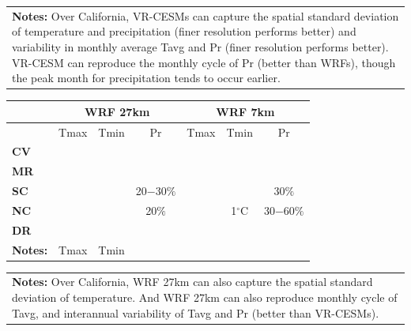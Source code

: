 \documentclass[draft,ms]{agutex}   %
\begin{document}
\begin{table}
\begin{center}
\begin{tabular}{p{6in}}
\small\textbf{Notes:} Over California, VR-CESMs can capture the spatial standard deviation of temperature and precipitation (finer resolution performs better) and variability in monthly average Tavg and Pr (finer resolution performs better). VR-CESM can reproduce the monthly cycle of Pr (better than WRFs), though the peak month for precipitation tends to occur earlier.
\end{tabular}

\begin{tabular*}{5.5in}{l @{\extracolsep{\fill}}cccccc}
\hline \textbf{} & \multicolumn{3}{c}{\textbf{WRF 27km}} & \multicolumn{3}{c}{\textbf{WRF 7km}} \\
\hline & Tmax & Tmin & Pr & Tmax & Tmin & Pr  \\
\hline \textbf{CV} & \cellcolor{red!60}{2$-$3$^\circ$C} & \cellcolor{blue!30}{1$^\circ$C} & \cellcolor{black!20} & \cellcolor{red!30}{1$-$2$^\circ$C}  & \cellcolor{black!20} & \cellcolor{red!60}{50$-$70$\%$} \\

\hline \textbf{MR} &  \cellcolor{blue!60}{2$^\circ$C} & \cellcolor{red!60}{2$^\circ$C} & \cellcolor{black!20} & \cellcolor{blue!60}{3$-$4$^\circ$C}  & \cellcolor{red!60}{2$^\circ$C} &  \cellcolor{red!60}{70$-$100$\%$}  \\

\hline \textbf{SC} &   \cellcolor{blue!60}{2$^\circ$C} & \cellcolor{red!30}{1$^\circ$C}  & \cellcolor{blue!30}20$-$30$\%$  &  \cellcolor{blue!60}{2$^\circ$C} & \cellcolor{red!30}{1$^\circ$C}  & \cellcolor{red!30}30$\%$ \\

\hline \textbf{NC} & \cellcolor{blue!60}{2$-$4$^\circ$C} & \cellcolor{black!20} & \cellcolor{blue!30}20$\%$ & \cellcolor{blue!60}{2$-$4$^\circ$C} & \cellcolor{red!30}1$^\circ$C & \cellcolor{red!60}30$-$60$\%$ \\

\hline \textbf{DR} & \cellcolor{black!20} & \cellcolor{black!20}  &  \cellcolor{blue!30}{20$-$40$\%$} & \cellcolor{blue!60}{2$-$3$^\circ$C} & \cellcolor{red!60}{2$^\circ$C}  &  \cellcolor{black!20} \\

\hline \hline \small\textbf{Notes:} & Tmax & Tmin & & & &\\
\hline
\end{tabular*}

\begin{tabular}{p{6in}}
\small\textbf{Notes:} Over California, WRF 27km can also capture the spatial standard deviation of temperature. And WRF 27km can also reproduce monthly cycle of Tavg, and interannual variability of Tavg and Pr (better than VR-CESMs).
\end{tabular}

\end{center}
\end{table}
\end{document}
